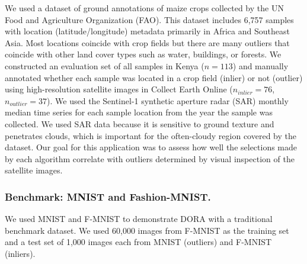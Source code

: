 \documentclass[letterpaper]{article} %
\newcommand{\todo}[1]{\textcolor{blue}{#1}}
\begin{document}
 We used a dataset of ground annotations of maize crops collected by the UN Food
 and Agriculture Organization (FAO). This dataset includes 6,757 samples
 with location (latitude/longitude) metadata primarily in Africa and Southeast
 Asia. Most locations coincide with crop
 fields but there are many outliers that coincide with other land cover types 
 such as water, buildings, or forests. We constructed an evaluation set 
 of all samples in Kenya ($n=113$) and manually annotated whether 
 each sample was located in a crop field (inlier) or not (outlier)
 using high-resolution satellite images in Collect Earth 
 Online ($n_{inlier}=76$, $n_{outlier}=37$). We used the Sentinel-1 
 synthetic aperture radar (SAR) monthly median
 time series for each sample location from the year the sample was 
 collected. We used SAR data because it is sensitive to ground texture and
  penetrates clouds, which is important for the often-cloudy region covered
  by the dataset. Our goal for this application was to assess how well the 
  selections made by each algorithm correlate with outliers determined by
  visual inspection of the satellite images.


\subsubsection{Benchmark: MNIST and Fashion-MNIST.}
We used MNIST and F-MNIST to demonstrate DORA with a
traditional benchmark dataset. We used 60,000 images from 
F-MNIST as the training set and a test set of 1,000 images each from MNIST (outliers) and F-MNIST (inliers). 
\end{document}
